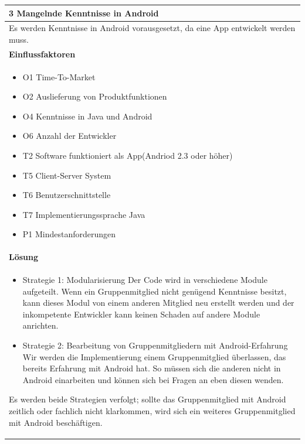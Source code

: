 \documentclass[fontsize=12pt,paper=a4,twoside]{scrartcl}
\begin{document}
\begin{table}[H]
\begin{tabular}{|p{\textwidth}|}\hline
3 Mangelnde Kenntnisse in Android\\ \hline
Es werden Kenntnisse in Android vorausgesetzt, da eine App entwickelt werden muss. \\ \hline
\textbf{Einflussfaktoren}\\
\begin{itemize}
\item O1 Time-To-Market
\item O2 Auslieferung von Produktfunktionen
\item O4 Kenntnisse in Java und Android
\item O6 Anzahl der Entwickler
\item T2 Software funktioniert als App(Andriod 2.3 oder höher)
\item T5 Client-Server System
\item T6 Benutzerschnittstelle
\item T7 Implementierungssprache Java
\item P1 Mindestanforderungen
\end{itemize}\\ \hline
\textbf{Lösung}\\
\begin{itemize}
\item Strategie 1: Modularisierung \leavevmode\newline
Der Code wird in verschiedene Module aufgeteilt. Wenn ein Gruppenmitglied nicht genügend Kenntnisse besitzt, kann dieses Modul von einem anderen Mitglied neu erstellt werden und der inkompetente Entwickler kann keinen Schaden auf andere Module anrichten.
\item Strategie 2: Bearbeitung von Gruppenmitgliedern mit Android-Erfahrung \leavevmode\newline
Wir werden die Implementierung einem Gruppenmitglied überlassen, das bereits Erfahrung mit Android hat. So müssen sich die anderen nicht in Android einarbeiten und können sich bei Fragen an eben diesen wenden.
\end{itemize}
Es werden beide Strategien verfolgt; sollte das Gruppenmitglied mit Android zeitlich oder fachlich nicht klarkommen, wird sich ein weiteres Gruppenmitglied mit Android beschäftigen. \\ \hline
\end{tabular}
\end{table}
\end{document}
